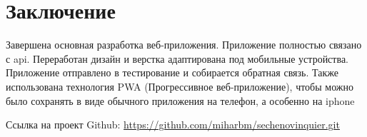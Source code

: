 \section*{Заключение}
\label{sec:3}

Завершена основная разработка веб-приложения.
Приложение полностью связано с api.
Переработан дизайн и верстка адаптирована под мобильные устройства.
Приложение отправлено в тестирование и собирается обратная связь.
Также использована технология PWA (Прогрессивное веб-приложение), чтобы можно было сохранять в виде обычного приложения на телефон, а особенно на iphone

Ссылка на проект Github:
\url{https://github.com/miharbm/sechenovinquier.git}